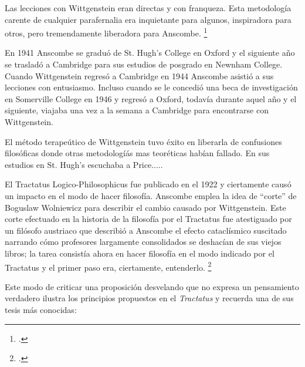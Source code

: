 Las lecciones con Wittgenstein eran directas y con franqueza. Esta metodología
carente de cualquier parafernalia era inquietante para algunos, inspiradora para
otros, pero tremendamente liberadora para Anscombe. \footcite[loc 9853 Chapter
4, Section 24, para. 5]{monk}

En 1941 Anscombe se graduó de St. Hugh's College en Oxford y el siguiente año se
trasladó a Cambridge para sus estudios de posgrado en Newnham College. Cuando
Wittgenstein regresó a Cambridge en 1944 Anscombe asistió a sus lecciones con
entusiasmo. Incluso cuando se le concedió una beca de investigación en
Somerville College en 1946 y regresó a Oxford, todavía durante aquel año y el
siguiente, viajaba una vez a la semana a Cambridge para encontrarse con
Wittgenstein.  

El método terapeútico de Wittgenstein tuvo éxito en liberarla de confusiones
filosóficas donde otras metodologíás mas teoréticas habían fallado. En sus
estudios en St. Hugh's escuchaba a Price.....




El Tractatus Logico-Philosophicus fue publicado en el 1922 y ciertamente causó
un impacto en el modo de hacer filosofía. Anscombe emplea la idea de ``corte''
de Boguslaw Wolniewicz para describir el cambio causado por Wittgenstein. Este
corte efectuado en la historia de la filosofía por el Tractatus fue atestiguado
por un filósofo austriaco que describió a Anscombe el efecto cataclísmico
suscitado narrando cómo profesores largamente consolidados se deshacían de sus
viejos libros; la tarea consistía ahora en hacer filosofía en el modo indicado
por el Tractatus y el primer paso era, ciertamente, entenderlo.
\footcite[p.181]{twocuts} 


Este modo de criticar una proposición desvelando que no expresa un pensamiento
verdadero ilustra los principios propuestos en el \emph{Tractatus} y recuerda
una de sus tesis más conocidas: 



